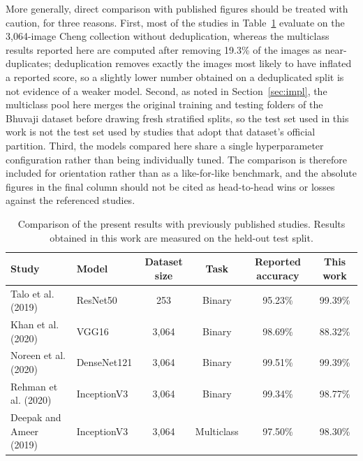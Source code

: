 \documentclass[final,3p,times,number]{elsarticle}
\begin{document}
More generally, direct comparison with published figures should be treated with caution, for three reasons. First, most of the studies in Table~\ref{tab:literature-comparison} evaluate on the 3,064-image Cheng collection without deduplication, whereas the multiclass results reported here are computed after removing 19.3\% of the images as near-duplicates; deduplication removes exactly the images most likely to have inflated a reported score, so a slightly lower number obtained on a deduplicated split is not evidence of a weaker model. Second, as noted in Section~\ref{sec:impl}, the multiclass pool here merges the original training and testing folders of the Bhuvaji dataset before drawing fresh stratified splits, so the test set used in this work is not the test set used by studies that adopt that dataset's official partition. Third, the models compared here share a single hyperparameter configuration rather than being individually tuned. The comparison is therefore included for orientation rather than as a like-for-like benchmark, and the absolute figures in the final column should not be cited as head-to-head wins or losses against the referenced studies.

\begin{table}[htbp]
\centering
\caption{Comparison of the present results with previously published studies. Results obtained in this work are measured on the held-out test split.}
\label{tab:literature-comparison}
\small
\begin{tabular*}{\textwidth}{@{\extracolsep{\fill}}llcccc@{}}
\toprule
Study & Model & Dataset size & Task & Reported accuracy & This work \\
\midrule
Talo et al. (2019) \cite{ref16} & ResNet50 & 253 & Binary & 95.23\% & 99.39\% \\
Khan et al. (2020) \cite{ref23} & VGG16 & 3,064 & Binary & 98.69\% & 88.32\% \\
Noreen et al. (2020) \cite{ref24} & DenseNet121 & 3,064 & Binary & 99.51\% & 99.39\% \\
Rehman et al. (2020) \cite{ref25} & InceptionV3 & 3,064 & Binary & 99.34\% & 98.77\% \\
Deepak and Ameer (2019) \cite{ref15} & InceptionV3 & 3,064 & Multiclass & 97.50\% & 98.30\% \\
\bottomrule
\end{tabular*}
\end{table}
\end{document}
